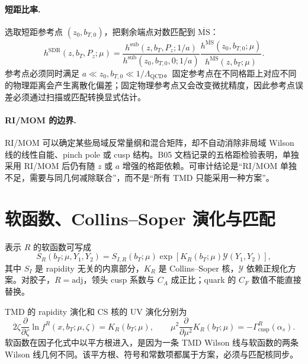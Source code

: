 \paragraph{短距比率.}
选取短距参考点 \((z_0,b_{T,0})\)，把剩余端点对数匹配到 \(\overline{\mathrm{MS}}\)：
\begin{equation}
  h^{\mathrm{SDR}}(z,b_T,P_z;\mu)
  =\frac{h^{\mathrm{sub}}(z,b_T,P_z;1/a)}
         {h^{\mathrm{sub}}(z_0,b_{T,0},0;1/a)}
   \frac{h^{\overline{\mathrm{MS}}}(z_0,b_{T,0};\mu)}
        {h^{\overline{\mathrm{MS}}}(z,b_T;\mu)}.
  \label{eq:b05-sdr}
\end{equation}
参考点必须同时满足 \(a\ll z_0,b_{T,0}\ll 1/\Lambda_{\mathrm{QCD}}\)。固定参考点在不同格距上对应不同的物理距离会产生离散化偏差；固定物理参考点又会改变微扰精度，因此参考点误差必须通过扫描或匹配转换显式估计。

\paragraph{RI/MOM 的边界.}
RI/MOM 可以确定某些局域反常量纲和混合矩阵，却不自动消除非局域 Wilson 线的线性自能、pinch pole 或 cusp 结构。B05 文档记录的五格距检验表明，单独采用 RI/MOM 后仍有随 \(z\) 或 \(a\) 增强的格距依赖。可审计结论是“RI/MOM 单独不足，需要与同几何减除联合”，而不是“所有 TMD 只能采用一种方案”。

\section{软函数、Collins--Soper 演化与匹配}

表示 \(R\) 的软函数可写成
\begin{equation}
  S_R(b_T;\mu,Y_1,Y_2)
  =S_{I,R}(b_T;\mu)
   \exp\!\left[K_R(b_T;\mu)\mathcal Y(Y_1,Y_2)\right],
  \label{eq:b05-soft-factorization}
\end{equation}
其中 \(S_I\) 是 rapidity 无关的内禀部分，\(K_R\) 是 Collins--Soper 核，\(\mathcal Y\) 依赖正规化方案。对胶子，\(R=\mathrm{adj}\)，领头 cusp 系数与 \(C_A\) 成正比；quark 的 \(C_F\) 数值不能直接替换。

TMD 的 rapidity 演化和 CS 核的 UV 演化分别为
\begin{equation}
  2\zeta\frac{\partial}{\partial\zeta}\ln f^R(x,b_T;\mu,\zeta)
  =K_R(b_T;\mu),
  \qquad
  \mu^2\frac{\partial}{\partial\mu^2}K_R(b_T;\mu)
  =-\Gamma_{\mathrm{cusp}}^R(\alpha_s).
  \label{eq:b05-cs-evolution}
\end{equation}
软函数在因子化式中以平方根进入，是因为一条 TMD Wilson 线与软函数的两条 Wilson 线几何不同。该平方根、符号和常数项都属于方案，必须与匹配核同步。

